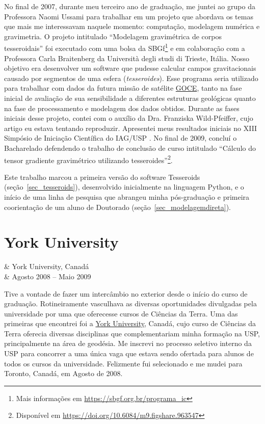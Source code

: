 \documentclass[10pt,a4paper,oneside]{book}
\newcommand{\Trieste}{Università degli studi di Trieste}
\begin{document}
No final de 2007, durante meu terceiro ano de graduação, me juntei ao grupo da
Professora Naomi Ussami para trabalhar em um projeto que abordava os temas que
mais me interessavam naquele momento: computação, modelagem numérica e
gravimetria.
O projeto intitulado ``Modelagem gravimétrica de corpos tesseroidais'' foi
executado com uma bolsa da
SBGf\footnote{Mais informações em \url{https://sbgf.org.br/programa_ic}}
e em colaboração com a Professora Carla Braitenberg da \Trieste{}, Itália.
Nosso objetivo era desenvolver um software que pudesse calcular campos
gravitacionais causado por segmentos de uma esfera (\textit{tesseroides}).
Esse programa seria utilizado para trabalhar com dados da futura missão de
satélite \href{https://www.esa.int/Enabling_Support/Operations/GOCE}{GOCE},
tanto na fase inicial de avaliação de sua sensibilidade a diferentes estruturas
geológicas quanto na fase de processamento e modelagem dos dados obtidos.
Durante as fases iniciais desse projeto, contei com o auxílio da Dra.
Franziska Wild-Pfeiffer, cujo artigo \citep{WildPfeiffer2008} eu estava
tentando reproduzir.
Apresentei meus resultados iniciais no XIII Simpósio de Iniciação Científica do
IAG/USP \citep{Uieda2008}.
No final de 2009, concluí o Bacharelado defendendo o trabalho de conclusão de
curso intitulado ``Cálculo do tensor gradiente gravimétrico utilizando
tesseroides''\footnote{Disponível em \url{https://doi.org/10.6084/m9.figshare.963547}}.

Este trabalho marcou a primeira versão do software Tesseroids
(seção~\ref{sec_tesseroids}), desenvolvido inicialmente na linguagem Python,
e o início de uma linha de pesquisa que abrangeu minha pós-graduação e primeira
coorientação de um aluno de Doutorado (seção~\ref{sec_modelagemdireta}).

\section{York University}
\label{sec_york}

\begin{subsummarybox}[frametitle=\faPlane{}\quad Intercâmbio internacional]
  \begin{fa-ul}
    \faUniversity & York University, Canadá\\
    \faCalendar & Agosto 2008 -- Maio 2009
  \end{fa-ul}
\end{subsummarybox}

Tive a vontade de fazer um intercâmbio no exterior desde o início do curso de
graduação.
Rotineiramente vasculhava as diversas oportunidades divulgadas pela
universidade por uma que oferecesse cursos de Ciências da Terra.
Uma das primeiras que encontrei foi a \href{https://www.yorku.ca/}{York University},
Canadá, cujo curso de Ciências da Terra oferecia diversas disciplinas que
complementariam minha formação na USP, principalmente na área de geodésia.
Me inscrevi no processo seletivo interno da USP para concorrer a uma única vaga
que estava sendo ofertada para alunos de todos os cursos da universidade.
Felizmente fui selecionado e me mudei para Toronto, Canadá, em Agosto de 2008.
\end{document}
